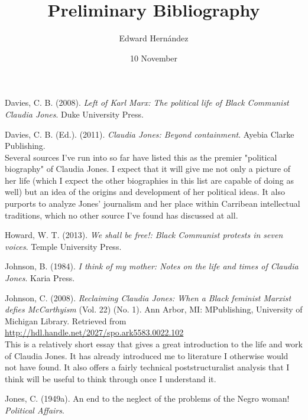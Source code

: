 \documentclass[doc,12pt]{apa6}
\begin{document}
\title{Preliminary Bibliography}
\author{Edward Hern\'{a}ndez}
\date{10 November}
\maketitle


\noindent
Davies, C. B. (2008). \emph{Left of Karl Marx: The political life of Black Communist Claudia Jones}. Duke University Press.

\noindent
Davies, C. B. (Ed.). (2011). \emph{Claudia Jones: Beyond containment}. Ayebia Clarke Publishing.
\vspace{6pt} \\ \-\hspace{2em}
Several sources I've run into so far have listed this as the premier "political
biography" of Claudia Jones. I expect that it will give me not only a picture
of her life (which I expect the other biographies in this list are capable of
doing as well) but an idea of the origins and development of her political
ideas. It also purports to analyze Jones' journalism and her place within
Carribean intellectual traditions, which no other source I've found has
discussed at all.

\noindent
Howard, W. T. (2013). \emph{We shall be free!: Black Communist protests in seven voices}. Temple University Press.

\noindent
Johnson, B. (1984). \emph{I think of my mother: Notes on the life and times of Claudia Jones}. Karia Press.

\noindent
Johnson, C. (2008). \emph{Reclaiming Claudia Jones: When a Black feminist Marxist defies McCarthyism} (Vol. 22) (No. 1). Ann Arbor, MI: MPublishing, University of Michigan Library. Retrieved from \url{http://hdl.handle.net/2027/spo.ark5583.0022.102}
\vspace{6pt} \\ \-\hspace{2em}
This is a relatively short essay that gives a great introduction to the life
and work of Claudia Jones. It has already introduced me to literature I
otherwise would not have found. It also offers a fairly technical
poststructuralist analysis that I think will be useful to think through once I
understand it.

\noindent
Jones, C. (1949a). An end to the neglect of the problems of the Negro woman! \emph{Political Affairs}.
\end{document}
